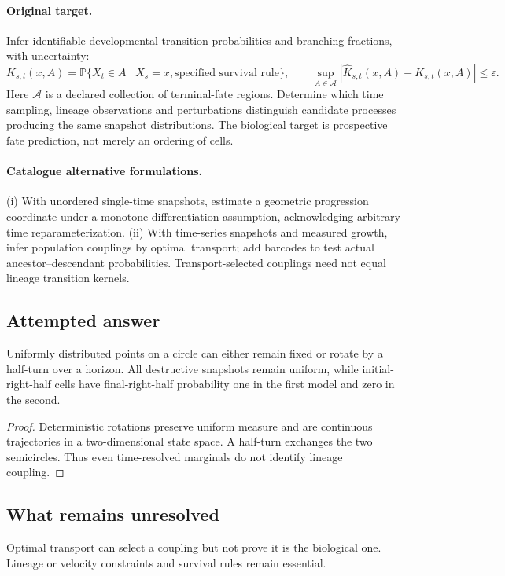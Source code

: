 \documentclass[11pt]{article}
\begin{document}
\paragraph{Original target.}
Infer identifiable developmental transition probabilities and branching fractions, with uncertainty:
\[K_{s,t}(x,A)=\mathbb{P}\{X_t\in A\mid X_s=x,\text{specified survival rule}\},\qquad \sup_{A\in\mathcal A}|\widehat K_{s,t}(x,A)-K_{s,t}(x,A)|\le\varepsilon.\]
Here $\mathcal A$ is a declared collection of terminal-fate regions. Determine which time sampling, lineage observations and perturbations distinguish candidate processes producing the same snapshot distributions. The biological target is prospective fate prediction, not merely an ordering of cells.
\paragraph{Catalogue alternative formulations.}
(i) With unordered single-time snapshots, estimate a geometric progression coordinate under a monotone differentiation assumption, acknowledging arbitrary time reparameterization. (ii) With time-series snapshots and measured growth, infer population couplings by optimal transport; add barcodes to test actual ancestor--descendant probabilities. Transport-selected couplings need not equal lineage transition kernels.
\subsection{Attempted answer}
\begin{proposition}
Uniformly distributed points on a circle can either remain fixed or rotate by a half-turn over a horizon. All destructive snapshots remain uniform, while initial-right-half cells have final-right-half probability one in the first model and zero in the second.
\end{proposition}
\begin{proof}
Deterministic rotations preserve uniform measure and are continuous trajectories in a two-dimensional state space. A half-turn exchanges the two semicircles. Thus even time-resolved marginals do not identify lineage coupling.
\end{proof}
\subsection{What remains unresolved}
Optimal transport can select a coupling but not prove it is the biological one. Lineage or velocity constraints and survival rules remain essential.
\end{document}
